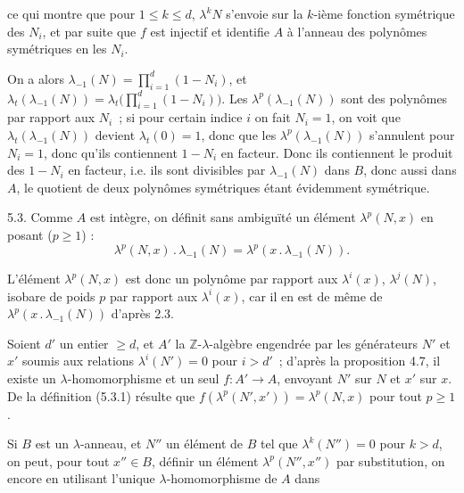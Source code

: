 
ce qui
montre que pour \(1\le k\le d\), \(\lambda^k N\) s'envoie sur la \(k\)-ième fonction symétrique des \(N_i\), et par suite que \(f\) est injectif et identifie \(A\) à l'anneau des polynômes symétriques en les \(N_i\).

On a alors \(\lambda_{-1}(N)=\prod_{i=1}^{d}(1-N_i)\), et \(\lambda_t(\lambda_{-1}(N))=\lambda_t\bigl(\prod_{i=1}^{d}(1-N_i)\bigr)\). Les \(\lambda^p(\lambda_{-1}(N))\) sont des polynômes par rapport aux \(N_i\)~; si pour certain indice \(i\) on fait \(N_i=1\), on voit que \(\lambda_t(\lambda_{-1}(N))\) devient \(\lambda_t(0)=1\), donc que les \(\lambda^p(\lambda_{-1}(N))\) s'annulent pour \(N_i=1\), donc qu'ils contiennent \(1-N_i\) en facteur. Donc ils contiennent le produit des \(1-N_i\) en facteur, i.e. ils sont divisibles par \(\lambda_{-1}(N)\) dans \(B\), donc aussi dans \(A\), le quotient de deux polynômes symétriques étant évidemment symétrique.

5.3. Comme \(A\) est intègre, on définit sans ambiguïté un élément \(\lambda^p(N,x)\) en posant (\(p\ge1\)) :
\begin{equation}\tag{5.3.1}
  \lambda^p(N,x)\mathbin{.}\lambda_{-1}(N)=\lambda^p(x\mathbin{.}\lambda_{-1}(N)).
\end{equation}

L'élément \(\lambda^p(N,x)\) est donc un polynôme par rapport aux \(\lambda^i(x)\), \(\lambda^j(N)\), isobare de poids \(p\) par rapport aux \(\lambda^i(x)\), car il en est de même de \(\lambda^p(x\mathbin{.}\lambda_{-1}(N))\) d'après 2.3.

Soient \(d'\) un entier \(\ge d\), et \(A'\) la \(\mathbb Z\)-\(\lambda\)-algèbre engendrée par les générateurs \(N'\) et \(x'\) soumis aux relations \(\lambda^i(N')=0\) pour \(i>d'\)~; d'après la proposition 4.7, il existe un \(\lambda\)-homomorphisme et un seul \(f:A'\longrightarrow A\), envoyant \(N'\) sur \(N\) et \(x'\) sur \(x\). De la définition (5.3.1) résulte que \(f(\lambda^p(N',x'))=\lambda^p(N,x)\) pour tout \(p\ge1\).

Si \(B\) est un \(\lambda\)-anneau, et \(N''\) un élément de \(B\) tel que \(\lambda^k(N'')=0\) pour \(k>d\), on peut, pour tout \(x''\in B\), définir un élément \(\lambda^p(N'',x'')\) par substitution, on encore en utilisant l'unique \(\lambda\)-homomorphisme de \(A\) dans 
